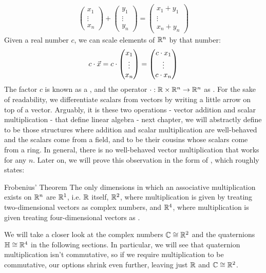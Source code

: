 \begin{align*}
	\begin{pmatrix}
		x_1\\
		\vdots\\
		x_n
	\end{pmatrix}
	+
	\begin{pmatrix}
		y_1\\
		\vdots\\
		y_n
	\end{pmatrix}
	=
	\begin{pmatrix}
		x_1 + y_1\\
		\vdots\\
		x_n + y_n
	\end{pmatrix}
\end{align*}
\newpar
Given a real number $c$, we can scale elements of $\mathbb{R}^n$ by that number:
\begin{align*}
	c \cdot \vec{x}
	=
	c \cdot 
	\begin{pmatrix}
		x_1\\
		\vdots\\
		x_n
	\end{pmatrix}
	=
	\begin{pmatrix}
		c \cdot x_1\\
		\vdots\\
		c \cdot x_n
	\end{pmatrix}
\end{align*}
The factor $c$ is known as a , and the operator $\cdot : \mathbb{R} \times \mathbb{R}^n \to \mathbb{R}^n$ as .
For the sake of readability, we differentiate scalars from vectors by writing a little arrow on top of a vector.
\newpar 
Arguably, it is these two operations - vector addition and scalar multiplication - that define linear algebra - next chapter, we will abstractly define  to be those structures where addition and scalar multiplication are well-behaved and the scalars come from a field, and  to be their cousins whose scalars come from a ring.
\newpar
In general, there is no well-behaved vector multiplication that works for any $n$. Later on, we will prove this observation in the form of , which roughly states:
\begin{importanttheorem}{Frobenius' Theorem}{}
	The only dimensions in which an associative multiplication exists on $\mathbb{R}^n$ are $\mathbb{R}^1$, i.e. $\mathbb{R}$ itself, $\mathbb{R}^2$, where multiplication is given by treating two-dimensional vectors as complex numbers, and $\mathbb{R}^4$, where multiplication is given treating four-dimensional vectors as .
\end{importanttheorem} 
We will take a closer look at the complex numbers $\mathbb{C} \cong \mathbb{R}^2$ and the quaternions $\mathbb{H} \cong \mathbb{R}^4$ in the following sections. In particular, we will see that quaternion multiplication isn't commutative, so if we require multiplication to be commutative, our options shrink even further, leaving just $\mathbb{R}$ and $\mathbb{C} \cong \mathbb{R}^2$.

